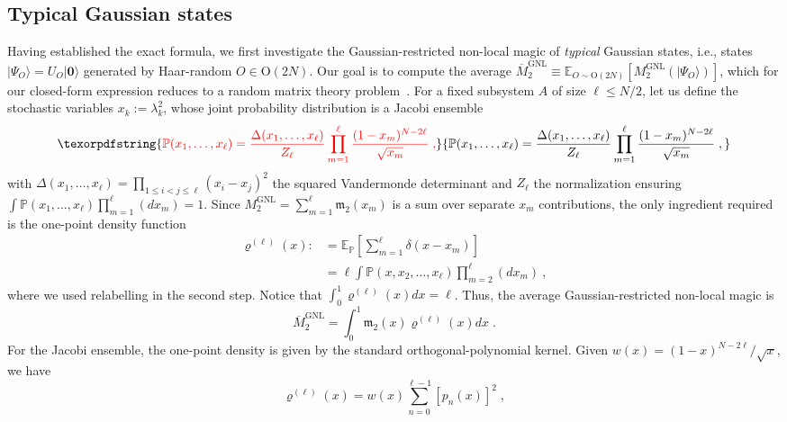 \documentclass[prx,twocolumn,superscriptaddress,aps,10pt, frontmatterverbose, reprint,footinbib,longbibliography=true]{revtex4-2}
\providecommand{\DIFaddtex}[1]{{\protect\color{red}#1}} %
\providecommand{\DIFaddbegin}{\protect\color{red}} %
\providecommand{\DIFaddend}{\protect\color{black}} %
\providecommand{\DIFaddtex}[1]{\texorpdfstring{\DIFaddtex{#1}}{#1}} %
\providecommand{\DIFadd}[1]{\texorpdfstring{\DIFaddtex{#1}}{#1}} %
\newcommand{\DIFaddincludegraphics}[2][]{{\color{blue}\fbox{\DIFOincludegraphics[#1]{#2}}}} %
\DeclareRobustCommand{\DIFaddbegin}{\DIFOaddbegin \let\includegraphics\DIFaddincludegraphics} %
\DeclareRobustCommand{\DIFaddend}{\DIFOaddend \let\includegraphics\DIFOincludegraphics} %
\begin{document}
\subsection{Typical Gaussian states}
Having established the exact formula, we first investigate the Gaussian-restricted non-local magic of \emph{typical} Gaussian states, i.e., states $|\Psi_O\rangle=U_O|\mathbf{0}\rangle$ generated by Haar-random $O\in \mathrm{O}(2N)$.
Our goal is to compute the average $\overline{M}_2^\mathrm{GNL}\equiv \mathbb{E}_{O\sim \mathrm{O}(2N)}[M_2^\mathrm{GNL}(|\Psi_O\rangle)]$, which for our closed-form expression reduces to a random matrix theory problem~\cite{Mehta2004,Livan_2018,vidmar2017entanglement}.
For a fixed subsystem $A$ of size $\ell\le N/2$, let us define the stochastic variables $x_k:=\lambda_k^2$, whose joint probability distribution is a Jacobi ensemble~\DIFaddbegin \DIFadd{\cite{Mehta2004,PhysRevB.103.L241118}
}\begin{equation}
    \DIFadd{\mathbb{P}(x_1,\dots,x_\ell) = \frac{\Delta(x_1,\dots,x_\ell)}{Z_\ell}  \prod_{m=1}^\ell \frac{(1-x_m)^{N-2\ell}}{\sqrt{x_m}}\;,
}\end{equation}\DIFaddend 
with $\Delta(x_1,\dots,x_\ell)=\prod_{1\le i<j\le \ell} (x_i-x_j)^2$ the squared Vandermonde determinant  and $Z_\ell$ the normalization ensuring $\int \mathbb{P}(x_1,\dots,x_\ell)\prod_{m=1}^\ell (dx_m)=1$. 
Since $M_2^\mathrm{GNL}=\sum_{m=1}^\ell \mathfrak{m}_2(x_m)$ is a sum over separate $x_m$ contributions, the only ingredient required is the one-point density function 
\begin{equation}
\begin{split}
    \varrho^{(\ell)}(x):&=\mathbb{E}_\mathbb{P}\left[\sum_{m=1}^\ell \delta(x-x_m)\right] \\&= \ell \int \mathbb{P}(x,x_2,\dots,x_\ell)\prod_{m=2}^\ell (dx_m)\:,
\end{split}
\end{equation}
where we used relabelling in the second step. Notice that $\int_0^1 \varrho^{(\ell)}(x) dx = \ell$.
Thus, the average Gaussian-restricted non-local magic is 
\begin{equation}
    \overline{M}_2^\mathrm{GNL}=\int_0^1 \mathfrak{m}_2(x) \varrho^{(\ell)}(x) dx\;.
\end{equation}
For the Jacobi ensemble, the one-point density is given by the standard orthogonal-polynomial kernel.
Given \DIFaddbegin \DIFadd{$w(x) = (1-x)^{N-2\ell}/\sqrt{x}$}\DIFaddend , we have~\cite{sierant2026theorymatchgatecommutant,sierant2026fermionic}
\begin{equation}
\varrho^{(\ell)}(x) = w(x) \sum_{n=0}^{\ell-1} [p_n(x)]^2\;,
\label{eq:ziopino}
\end{equation}
\end{document}
